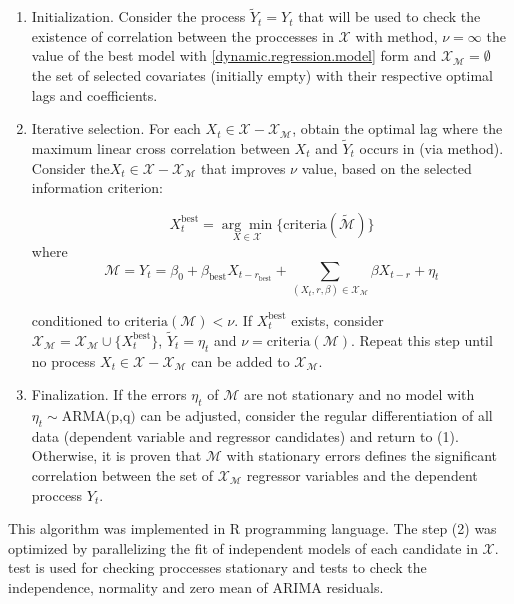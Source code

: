 \documentclass[a4paper]{easychair}
\begin{document}
\begin{enumerate}
    \item Initialization. Consider the process $\tilde{Y}_t=Y_t$ that will be used to check the existence of correlation between the proccesses in $\mathcal{X}$ with \cite{cryer2008time} method, $\nu=\infty$ the value of the best model with \ref{dynamic.regression.model} form and $\mathcal{X}_\mathcal{M} = \emptyset$ the set of selected covariates (initially empty) with their respective optimal lags and coefficients.
    \item Iterative selection. For each $X_t\in\mathcal{X}-\mathcal{X}_\mathcal{M}$, obtain the optimal lag where the maximum linear cross correlation between $X_t$ and $\tilde{Y}_t$ occurs in (via \cite{cryer2008time} method). Consider the$X_t\in\mathcal{X}-\mathcal{X}_\mathcal{M}$ that improves $\nu$ value, based on the selected information criterion:
    
    \[ X^\text{best}_t =  \underset{X\in\mathcal{X}}{\arg\min} \Big\{ \text{criteria}(\tilde{\mathcal{M}}) \Big\} \] 
    where 
    \[ \mathcal{M} =  Y_t = \beta_0 + \beta_\text{best} X_{t-r_\text{best}} + \sum_{(X_t, r, \beta) \in \mathcal{X}_\mathcal{M}} \beta X_{t-r} + \eta_t \] 

    conditioned to $\text{criteria}(\mathcal{M}) < \nu$. If $X^{\text{best}}_t$ exists, consider $\mathcal{X}_\mathcal{M} = \mathcal{X}_\mathcal{M} \cup \{X_t^\text{best}\}$, $\tilde{Y}_t = \eta_t$ and $\nu=\text{criteria}(\mathcal{M})$. Repeat this step until no process $X_t\in\mathcal{X}-\mathcal{X}_\mathcal{M}$ can be added to $\mathcal{X}_\mathcal{M}$.
    \item Finalization. If the errors $\eta_t$ of $\mathcal{M}$ are not stationary and no model with $\eta_t\sim\text{ARMA(p,q)}$ can be adjusted, consider the regular differentiation of all data (dependent variable and regressor candidates) and return to (1). Otherwise, it is proven that $\mathcal{M}$ with stationary errors defines the significant correlation between the set of $\mathcal{X}_\mathcal{M}$ regressor variables and the dependent proccess $Y_t$.
\end{enumerate}

This algorithm was implemented in R programming language. The step (2) was optimized by parallelizing the fit of independent models of each candidate in $\mathcal{X}$. \cite{dickey1979distribution} test is used for checking proccesses stationary and \cite{Haynes2013, shapiro1965analysis, Jarque2011, ljungbox1970, ljungbox1978} tests to check the independence, normality and zero mean of ARIMA residuals. 
\end{document}
